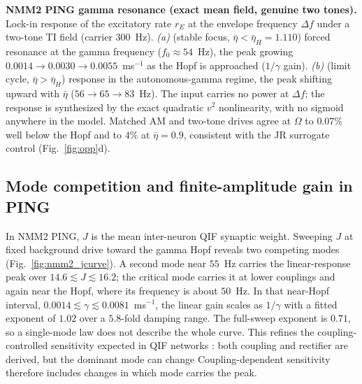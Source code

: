 \documentclass[11pt,a4paper]{article}
\newif\ifjne
\providecommand{\DIFaddtex}[1]{{\protect\color{blue} \sf #1}} %
\providecommand{\DIFdeltex}[1]{{\protect\color{red} \scriptsize #1}} %
\providecommand{\DIFaddbegin}{} %
\providecommand{\DIFaddend}{} %
\providecommand{\DIFdelbegin}{} %
\providecommand{\DIFdelend}{} %
\providecommand{\DIFdelFL}[1]{\DIFdel{#1}} %
\providecommand{\DIFadd}[1]{\texorpdfstring{\DIFaddtex{#1}}{#1}} %
\providecommand{\DIFdel}[1]{\texorpdfstring{\DIFdeltex{#1}}{}} %
\begin{document}
\DIFdelbegin %
{%
\DIFdelFL{\textbf{NMM2 PING gamma resonance (exact mean field, genuine two tones).}
Lock-in response of the excitatory rate $r_E$ at the envelope frequency $\Delta f$ under a
two-tone TI field (carrier $300$~Hz). \emph{(a)} (stable focus,
$\bar\eta<\bar\eta_H=1.110$) forced resonance at the gamma frequency
($f_0\!\approx\!54$~Hz), the peak growing $0.0014\!\to\!0.0030\!\to\!0.0055$~ms$^{-1}$ as the Hopf
is approached ($1/\gamma$ gain). \emph{(b)} (limit cycle,
$\bar\eta>\bar\eta_H$) response in the autonomous-gamma regime, the peak shifting
upward with $\bar\eta$ ($56\!\to\!65\!\to\!83$~Hz). The input carries no power at
$\Delta f$; the response is synthesized by the exact quadratic $v^2$ nonlinearity, with no
sigmoid anywhere in the model. Matched AM and two-tone drives agree at $\Omega$ to
$0.07\%$ well below the Hopf and to $4\%$ at $\bar\eta=0.9$, consistent with the JR
surrogate control (Fig.~\ref{fig:opp}d).}}

\DIFdelend \DIFaddbegin \ifjne\else
\subsection{\DIFadd{Mode competition and finite-amplitude gain in PING}}\label{supp:ping-coupling-results}
\DIFaddend In NMM2 PING, $J$ is the mean inter-neuron QIF synaptic weight.
Sweeping $J$ at fixed background drive toward the gamma Hopf reveals two
competing modes (Fig.~\ref{fig:nmm2_jcurve}). A second mode near $55$~Hz carries
the linear-response peak over $14.6\lesssim J\lesssim16.2$; the critical mode
carries it at lower couplings and again near the Hopf, where its frequency is
about $50$~Hz. In that near-Hopf interval,
$0.0014\lesssim\gamma\lesssim0.0081$~ms$^{-1}$, the linear gain scales as
$1/\gamma$ with a fitted exponent of $1.02$ over a $5.8$-fold damping range.
The full-sweep exponent is $0.71$, so a single-mode law does not describe the
whole curve. \DIFdelbegin \DIFdel{This refines the coupling-controlled sensitivity expected in QIF
networks \cite{clusella2023} : both coupling and rectifier are derived, but the
dominant mode can change}\DIFdelend \DIFaddbegin \DIFadd{Coupling-dependent sensitivity \cite{clusella2023} therefore
includes changes in which mode carries the peak}\DIFaddend .
\end{document}
